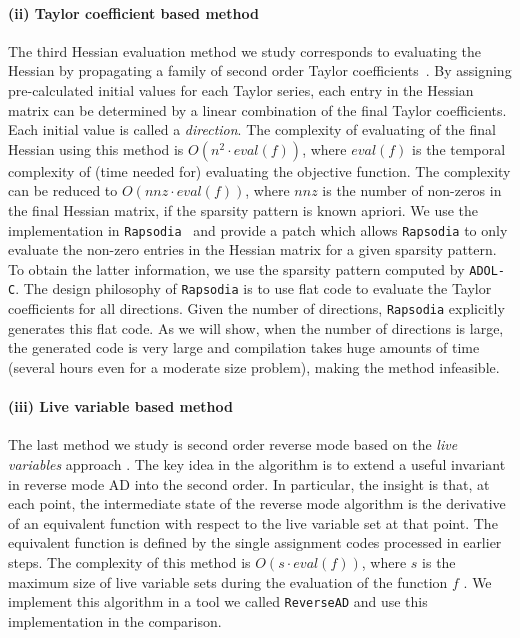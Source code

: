 \documentclass[11pt, a4paper, english]{article}
\begin{document}
\paragraph{(ii) Taylor coefficient based method} 
The third Hessian evaluation method  we study  corresponds to evaluating the Hessian by propagating a family of second order Taylor coefficients~\cite{griewank2000evaluating}. 
By assigning pre-calculated initial values for each Taylor series, each entry in the Hessian matrix  can be determined by a linear combination of the final Taylor coefficients. Each initial value is called a {\em direction}.
The complexity of evaluating of the final Hessian using this method is $O(n^2 \cdot eval(f))$, where $eval(f)$ is the temporal complexity of (time needed for) evaluating the objective function.
The complexity can be reduced to $O(nnz \cdot eval(f))$, where $nnz$ is the number of non-zeros in the final Hessian matrix, if the sparsity pattern is known apriori.
We use the implementation in {\tt Rapsodia}~\cite{charpentier2009fast} and provide a patch which allows {\tt Rapsodia} to only evaluate the non-zero entries in the Hessian matrix for a given sparsity pattern. To obtain the latter information, we use the sparsity pattern computed by {\tt ADOL-C}. The design philosophy of {\tt Rapsodia} is to use flat code to evaluate the Taylor coefficients for all directions. Given the number of directions, {\tt Rapsodia} explicitly generates this flat code. As we will show, when the number of directions is large, the generated code is very large and compilation takes huge amounts of time (several hours even for a moderate size problem), making the method infeasible. 

\paragraph{(iii) Live variable based method}
The last method we study is second order reverse mode based on the {\em live variables} approach \cite{wang2016capitalizing}. The key idea in the algorithm is to extend a useful invariant in reverse mode AD into the second order. In particular, the insight is that, at each point, the intermediate state of the reverse mode algorithm is the derivative of an equivalent function with respect to the live variable set at that point. The equivalent function is defined by the single assignment codes processed in earlier steps. 
The complexity of this method is $O(s \cdot eval(f))$, where $s$ is the maximum size of live variable sets during the evaluation of the function $f$ \cite{wang2016capitalizing}.
We implement this algorithm in a tool we called {\tt ReverseAD} and use this implementation in the comparison.
\end{document}

